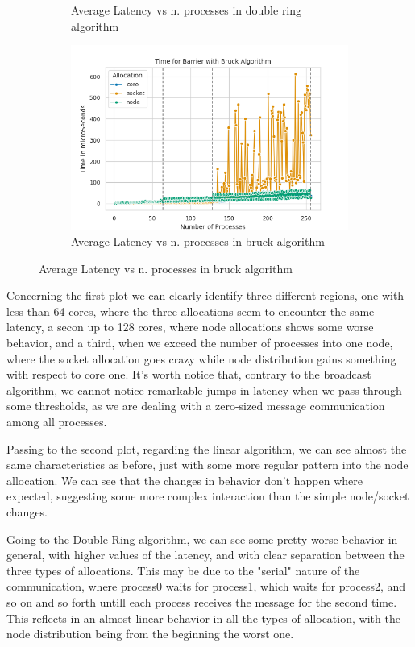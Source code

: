 \documentclass{article}
\begin{document}
\begin{figure}[h]
\begin{subfigure}{0.45\textwidth}
			\caption{Average Latency vs n. processes in double ring algorithm}
			\label{fig:barrierring}
		\end{subfigure}
		\begin{subfigure}{0.45\textwidth}
			\centering
			\includegraphics[width=0.7\linewidth]{../exercise1/plots/barrier_bruck}
			\caption{Average Latency vs n. processes in bruck algorithm}
			\label{fig:barrierbruck}
		\end{subfigure}
	\end{figure}
	
	Concerning the first plot we can clearly identify three different regions, one with less than 64 cores, where the three allocations seem to encounter the same latency, a secon up to 128 cores, where node allocations shows some worse behavior, and a third, when we exceed the number of processes into one node, where the socket allocation goes crazy while node distribution gains something with respect to core one. It's worth notice that, contrary to the broadcast algorithm, we cannot notice remarkable jumps in latency when we pass through some thresholds, as we are dealing with a zero-sized message communication among all processes.
	
	Passing to the second plot, regarding the linear algorithm, we can see almost the same characteristics as before, just with some more regular pattern into the node allocation. We can see that the changes in behavior don't happen where expected, suggesting some more complex interaction than the simple node/socket changes.
	
	Going to the Double Ring algorithm, we can see some pretty worse behavior in general, with higher values of the latency, and with clear separation between the three types of allocations. This may be due to the "serial" nature of the communication, where process0 waits for process1, which waits for process2, and so on and so forth untill each process receives the message for the second time. This reflects in an almost linear behavior in all the types of allocation, with the node distribution being from the beginning the worst one.
	
\end{document}
